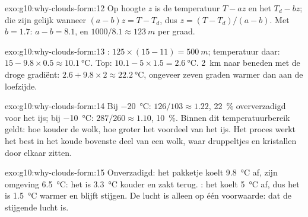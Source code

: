 \begin{solution}{exo:g10:why-clouds-form:12}
Op hoogte $z$ is de temperatuur $T - a z$ en het  $T_d - b z$; die zijn
gelijk wanneer $(a - b) z = T - T_d$, dus $z = (T - T_d)/(a - b)$. Met
$b = 1.7$: $a - b = 8.1$, en $1000/8.1 \approx \qty{123}{m}$ per graad.
\end{solution}

\begin{solution}{exo:g10:why-clouds-form:13}
: $125 \times (15 - 11) = \qty{500}{m}$; temperatuur daar:
$15 - 9.8 \times 0.5 \approx \qty{10.1}{\degreeCelsius}$. Top: $10.1 - 5
\times 1.5 = \qty{2.6}{\degreeCelsius}$. \qty{2}{km} naar beneden met de droge
gradiënt: $2.6 + 9.8 \times 2 \approx \qty{22.2}{\degreeCelsius}$, ongeveer
zeven graden warmer dan aan de loefzijde.
\end{solution}

\begin{solution}{exo:g10:why-clouds-form:14}
Bij \qty{-20}{\degreeCelsius}: $126/103 \approx 1.22$, \qty{22}{\percent}
oververzadigd voor het ijs; bij \qty{-10}{\degreeCelsius}: $287/260 \approx
1.10$, \qty{10}{\percent}. Binnen dit temperatuurbereik geldt: hoe kouder de wolk,
hoe groter het voordeel van het ijs. Het proces werkt het best in het koude
bovenste deel van een wolk, waar druppeltjes en kristallen door elkaar zitten.
\end{solution}

\begin{solution}{exo:g10:why-clouds-form:15}
Onverzadigd: het pakketje koelt \qty{9.8}{\degreeCelsius} af, zijn omgeving
\qty{6.5}{\degreeCelsius}: het is \qty{3.3}{\degreeCelsius} kouder en zakt terug.
: het koelt \qty{5}{\degreeCelsius} af, dus het is
\qty{1.5}{\degreeCelsius} warmer en blijft stijgen. De lucht is alleen 
op één voorwaarde: dat de stijgende lucht  is.
\end{solution}

